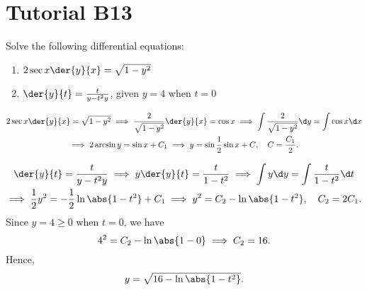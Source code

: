 \section{Tutorial B13}

\begin{problem}
    Solve the following differential equations:
    \begin{enumerate}
        \item $2\sec x \der{y}{x} = \sqrt{1 - y^2}$
        \item $\der{y}{t} = \frac{t}{y-t^2 y}$, given $y = 4$ when $t = 0$
    \end{enumerate}
\end{problem}
\begin{solution}
    \begin{ppart}
        \begin{gather*}
            2\sec x \der{y}{x} = \sqrt{1 - y^2} \implies \frac{2}{\sqrt{1-y^2}} \der{y}{x} = \cos x \implies \int \frac{2}{\sqrt{1-y^2}} \d y = \int \cos x \d x\\
            \implies 2\arcsin y = \sin x + C_1 \implies y = \sin{\frac12 \sin x + C}, \quad C = \frac{C_1}{2}.
        \end{gather*}
    \end{ppart}
    \begin{ppart}
        \begin{gather*}
            \der{y}{t} = \frac{t}{y-t^2 y} \implies y \der{y}{t} = \frac{t}{1-t^2} \implies \int y \d y = \int \frac{t}{1-t^2} \d t\\
            \implies \frac12 y^2 = -\frac12 \ln \abs{1-t^2} + C_1 \implies y^2 = C_2 - \ln \abs{1 - t^2}, \quad C_2 = 2C_1.
        \end{gather*}
        Since $y = 4 \geq 0$ when $t = 0$, we have \[4^2 = C_2 - \ln \abs{1 - 0} \implies C_2 = 16.\] Hence, \[y = \sqrt{16 - \ln \abs{1 - t^2}}.\]
    \end{ppart}
\end{solution}

